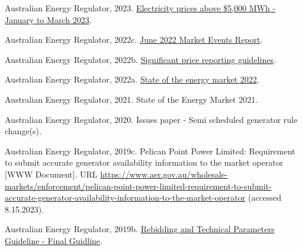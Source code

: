 \documentclass[12pt,a4paper,]{report}
\newlength{\cslhangindent}
\newenvironment{CSLReferences}[2] %
 {%
  \setlength{\parindent}{0pt}
  \ifodd #1 \everypar{\setlength{\hangindent}{\cslhangindent}}\ignorespaces\fi
  \ifnum #2 > 0
  \setlength{\parskip}{#2\baselineskip}
  \fi
 }%
 {}
\begin{document}
\begin{CSLReferences}{1}{0}
\leavevmode{}%
Australian Energy Regulator, 2023.
\href{https://www.aer.gov.au/system/files/AER\%20-\%20Electricity\%20prices\%20above\%20\%245\%2C000\%20MWh\%20-\%20January\%20to\%20March\%202023_1.pdf}{Electricity
prices above \$5,000 {MWh} - {January} to {March} 2023}.

\leavevmode{}%
Australian Energy Regulator, 2022c.
\href{https://www.aer.gov.au/system/files/AER\%20June\%202022\%20Market\%20Events\%20Report-\%20FINAL\%20VERSION\%20-\%2014\%20December\%202022.pdf}{June
2022 {Market Events Report}}.

\leavevmode{}%
Australian Energy Regulator, 2022b.
\href{https://www.aer.gov.au/system/files/AER\%20-\%20Significant\%20Price\%20Reporting\%20Guidelines\%20-\%20September\%202022_0.pdf}{Significant
price reporting guidelines}.

\leavevmode{}%
Australian Energy Regulator, 2022a.
\href{https://www.aer.gov.au/system/files/State\%20of\%20the\%20energy\%20market\%202022\%20-\%20Full\%20report.pdf}{State
of the energy market 2022}.

\leavevmode{}%
Australian Energy Regulator, 2021. State of the {Energy Market} 2021.

\leavevmode{}%
Australian Energy Regulator, 2020. Issues paper - {Semi} scheduled
generator rule change(s).

\leavevmode{}%
Australian Energy Regulator, 2019c. Pelican {Point Power Limited}:
Requirement to submit accurate generator availability information to the
market operator {[}WWW Document{]}. URL
\url{https://www.aer.gov.au/wholesale-markets/enforcement/pelican-point-power-limited-requirement-to-submit-accurate-generator-availability-information-to-the-market-operator}
(accessed 8.15.2023).

\leavevmode{}%
Australian Energy Regulator, 2019b.
\href{https://www.aer.gov.au/system/files/For\%20publish\%20-\%20Rebidding\%20and\%20technical\%20parameters\%20guideline\%20-\%20final\%20guideline\%20\%282019\%20amendments\%29.pdf}{Rebidding
and {Technical Parameters Guideline} - {Final Guidline}}.


\end{CSLReferences}
\end{document}
